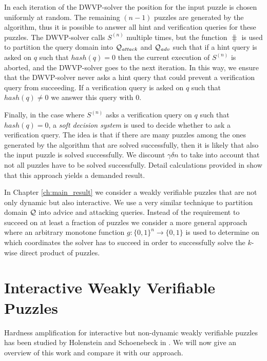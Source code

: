 In each iteration of the DWVP-solver the position for the input puzzle is chosen uniformly at random.
The remaining $(n-1)$ puzzles are generated by the algorithm, thus it is possible to answer
all hint and verification queries for these puzzles.
The DWVP-solver calls $S^{(n)}$ multiple times, but the function $\hash$ is used
to partition the query domain into $\mathcal{Q}_{\mathit{attack}}$ and $\mathcal{Q}_{\mathit{adv}}$ such that
if a hint query is asked on $q$ such that $hash(q) = 0$ then the current execution of $S^{(n)}$
is aborted, and the DWVP-solver goes to the next iteration.
In this way, we ensure that the DWVP-solver never asks a hint query that could prevent a verification query from succeeding.
If a verification query is asked on $q$ such that $hash(q) \neq 0$ we answer this query with $0$.

Finally, in the case where $S^{(n)}$ asks a verification query on $q$ such that $hash(q) = 0$,
a \textit{soft decision system} is used to decide whether to ask a verification query.
The idea is that if there are many puzzles among the ones generated by the algorithm that are solved successfully,
then it is likely that also the input puzzle is solved successfully.
We discount $\gamma\delta n$ to take into account that not all puzzles have to be solved successfully.
Detail calculations provided in \cite{dodis2009security} show that this approach
yields a demanded result.

In Chapter \ref{ch:main_result} we consider a weakly verifiable puzzles that are not only dynamic but also interactive.
We use a very similar technique to partition domain $\mathcal{Q}$ into advice and attacking queries.
Instead of the requirement to succeed on at least a fraction of puzzles we consider a more general approach where
an arbitrary monotone function $g : \{0,1\}^{n} \rightarrow \{0,1\}$ is used to
determine on which coordinates the solver has to succeed in order to successfully solve the $k$-wise direct product of puzzles.

\section{Interactive Weakly Verifiable Puzzles}
\label{section:iwvp}
Hardness amplification for interactive but non-dynamic weakly verifiable puzzles
has been studied by Holenstein and Schoenebeck in \cite{holenstein2011general}.
We will now give an overview of this work and compare it with our approach.

